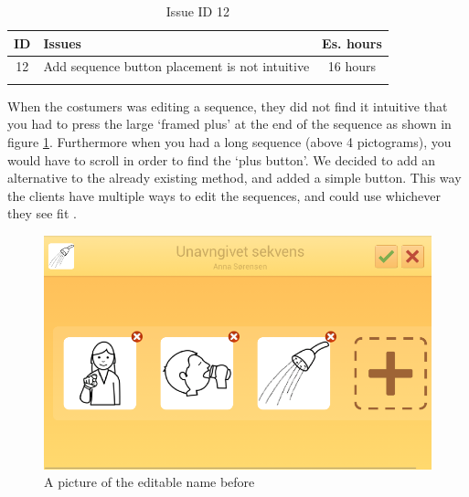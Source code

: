 \begin{longtable} { | c | p{12cm} | c | } 
\hline
	ID 	&	Issues	&		 Es. hours \\\hline
	12 	&	Add sequence button placement is not intuitive	&	16 hours \\\hline
\caption{Issue ID 12}
\label{tab:spr3_addsequencenotintuitive}
\end{longtable}

When the costumers was editing a sequence, they did not find it intuitive that you had to press the large `framed plus' at the end of the sequence as shown in figure \ref{fig:Old_editSequence}. Furthermore when you had a long sequence (above 4 pictograms), you would have to scroll in order to find the `plus button'. We decided to add an alternative to the already existing method, and added a simple button. This way the clients have multiple ways to edit the sequences, and could use whichever they see fit .

\begin{figure} [h!]
\centering
\begin{minipage}{.7\textwidth}
\centering
\includegraphics{Pics/Sprint3/EditModeCropped}
\caption{A picture of the editable name before}
\label{fig:Old_editSequence}
\end{minipage}\hfill
\end{figure}